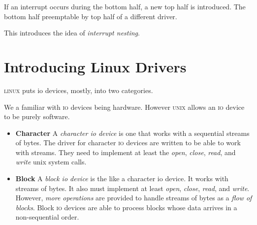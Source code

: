 If an interrupt occurs during the bottom half, 
a new top half is introduced. 
The bottom half preemptable by top half of a different driver.

This introduces the idea of \textit{interrupt nesting}.






\section{Introducing Linux Drivers}








\textsc{linux} puts io devices, mostly, into two categories.


\begin{figure}[h]
\end{figure}

We a familiar with \textsc{io} devices being hardware.
However \textsc{unix} allows an \textsc{io} device to be purely software. 


\begin{itemize}   
\renewcommand{\labelitemi}{$\Box$}
\item \textbf{Character} 
A \textit{character io device} is one that works with a sequential streams of bytes. 
The driver for character \textsc{io} devices are written to be able to work with streams.
They need to implement at least the \textit{open}, \textit{close}, \textit{read}, and 
\textit{write} unix system calls. 
\item \textbf{Block} 
A \textit{block io device} is the like a character io device. 
It works with streams of bytes. It also must implement at least 
\textit{open}, \textit{close}, \textit{read}, and \textit{write}. 
However, \textit{more operations} are provided to handle streams of bytes as 
a \textit{flow of blocks}. Block \textsc{io} devices are 
able to process blocks whose data arrives in a non-sequential order.
\end{itemize}

